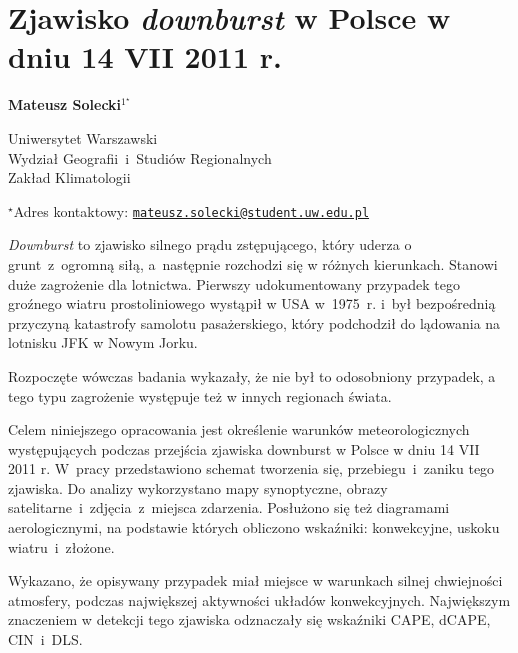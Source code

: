 \documentclass[\main/boa.tex]{subfiles}
\begin{document}
\sloppy


\section{Zjawisko \emph{downburst} w Polsce w dniu 14 VII 2011 r.}

\begin{center}
  {\bf {} Mateusz Solecki$^{1^\star}$}
\end{center}

\vskip 0.3cm

\begin{affiliations}
\begin{enumerate}
\begin{minipage}{0.915\textwidth}
\centering
\item Uniwersytet Warszawski\\ Wydział Geografii~i~Studiów Regionalnych\\ Zakład Klimatologii\\[-2pt]
\end{minipage}
\end{enumerate}
$^\star$Adres kontaktowy: \href{mailto:mateusz.solecki@student.uw.edu.pl}{\nolinkurl{mateusz.solecki@student.uw.edu.pl}}\\
\end{affiliations}

\vskip 0.5cm


\vskip 0.5cm

\emph{Downburst} to zjawisko silnego prądu zstępującego, który uderza o grunt~z~ogromną siłą, a następnie rozchodzi się w różnych kierunkach. Stanowi duże zagrożenie dla lotnictwa. Pierwszy udokumentowany przypadek tego groźnego wiatru prostoliniowego wystąpił 
w USA w 1975 r. i~był bezpośrednią przyczyną katastrofy samolotu pasażerskiego, który podchodził do lądowania na lotnisku JFK w Nowym Jorku. 

Rozpoczęte wówczas badania wykazały, że nie był to odosobniony przypadek, a tego typu zagrożenie występuje też w innych regionach świata.

Celem niniejszego opracowania jest określenie warunków meteorologicznych występujących podczas przejścia zjawiska downburst w Polsce w dniu 14 VII 2011 r. W pracy przedstawiono schemat tworzenia się, przebiegu~i~zaniku tego zjawiska.  Do analizy wykorzystano mapy synoptyczne, obrazy satelitarne~i~zdjęcia~z~miejsca zdarzenia. Posłużono się też diagramami aerologicznymi, na podstawie których obliczono wskaźniki: konwekcyjne, uskoku wiatru~i~złożone.

Wykazano, że opisywany przypadek miał miejsce w warunkach silnej chwiejności atmosfery, podczas największej aktywności układów konwekcyjnych. Największym znaczeniem w detekcji tego zjawiska odznaczały się wskaźniki CAPE, dCAPE, CIN~i~DLS. 
\end{document}
